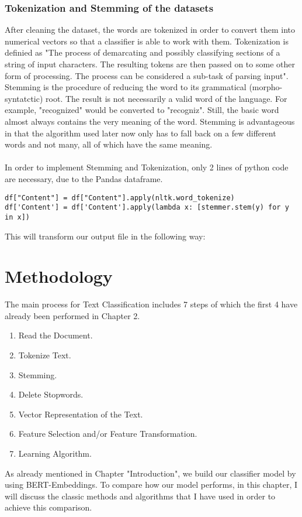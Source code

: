 \documentclass[a4paper, 11pt,titlepage,oneside,openany]{book}
\begin{document}
\subsection{Tokenization and Stemming of the datasets}
After cleaning the dataset, the words are tokenized in order to convert them into numerical vectors so that a classifier is able to work with them. Tokenization is definied as "The process of demarcating and possibly classifying sections of a string of input characters. The resulting tokens are then passed on to some other form of processing. The process can be considered a sub-task of parsing input".\\
\noindent Stemming is the procedure of reducing the word to its grammatical (morpho-syntatctic) root. The result is not necessarily a valid word of the language. For example, "recognized" would be converted to "recogniz". Still, the basic word almost always contains the very meaning of the word. Stemming is advantageous in that the algorithm used later now only has to fall back on a few different words and not many, all of which have the same meaning.\\
\\
\noindent In order to implement Stemming and Tokenization, only 2 lines of python code are necessary, due to the Pandas dataframe. \\
\noindent
\begin{minipage}{\linewidth}
\begin{lstlisting}[frame=single]
df["Content"] = df["Content"].apply(nltk.word_tokenize)
df['Content'] = df['Content'].apply(lambda x: [stemmer.stem(y) for y in x])
\end{lstlisting}
\end{minipage}
This will transform our output file in the following way:

\chapter{Methodology}
\noindent The main process for Text Classification includes 7 steps of which the first 4 have already been performed in Chapter 2.
\begin{enumerate}
	\item Read the Document.  
	\item Tokenize Text.
	\item Stemming.
	\item Delete Stopwords.
	\item Vector Representation of the Text.
	\item Feature Selection and/or Feature Transformation.
	\item Learning Algorithm.
\end{enumerate}
As already mentioned in Chapter "Introduction", we build our classifier model by using BERT-Embeddings. To compare how our model performs, in this chapter, I will discuss the classic methods and algorithms that I have used in order to achieve this comparison. \\	
\end{document}
